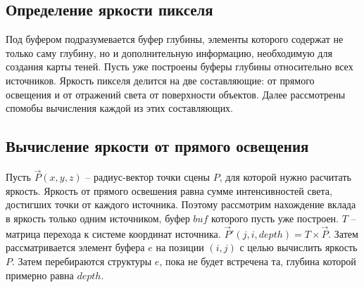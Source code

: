 {    \subsection{Определение яркости пикселя} {
        Под буфером подразумевается буфер глубины, элементы которого содержат не только
        саму глубину, но и дополнительную информацию,
        необходимую для создания карты теней.
        Пусть уже построены буферы глубины относительно всех источников.
        Яркость пикселя делится на две составляющие: от прямого освещения и от
        отражений света от поверхности объектов.
        Далее рассмотрены спомобы вычисления каждой из этих составляющих.
        \subsection{Вычисление яркости от прямого освещения} {
            Пусть $\vec{P}(x, y, z)$ -- радиус-вектор точки сцены $P$,
            для которой нужно расчитать яркость.
            Яркость от прямого освешения равна сумме интенсивностей света, достигших
            точки от каждого источника.
            Поэтому рассмотрим нахождение вклада в яркость только одним источником,
            буфер $buf$ которого пусть уже построен.
            $T$ -- матрица перехода к системе координат источника.
            $\vec{P}'(j, i, depth) = T \times \vec{P}$.
            Затем рассматривается элемент буфера $e$ на позиции $(i, j)$
            с целью вычислить яркость $P$.
            Затем перебираются структуры $e$, пока не будет встречена та,
            глубина которой примерно равна $depth$.
        }
}}
